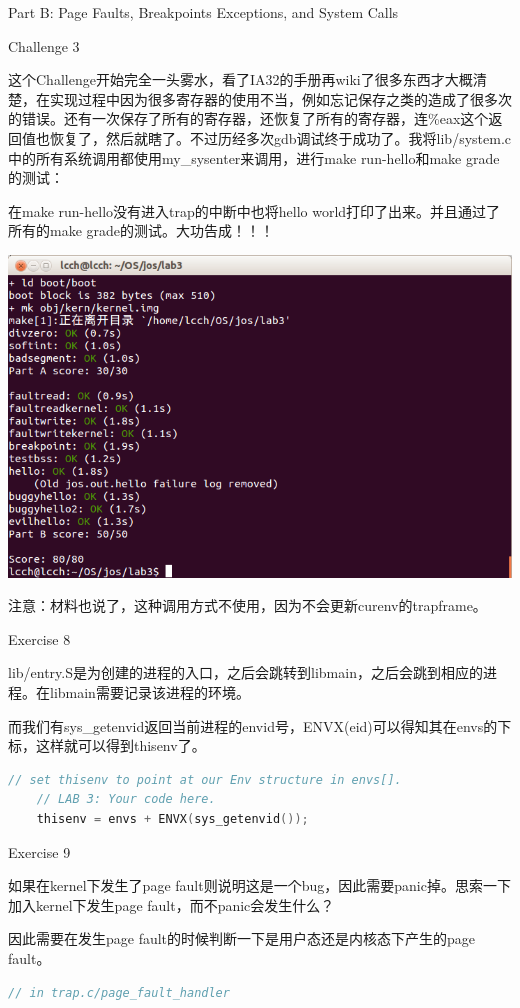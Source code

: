 \documentclass[GBK,winfonts,a4paper,10pt]{ctexart}
\begin{document}
\begin{section}{ Part B: Page Faults, Breakpoints Exceptions, and System Calls }
\begin{subsection}{ Challenge 3 }
\par
这个Challenge开始完全一头雾水，看了IA32的手册再wiki了很多东西才大概清楚，在实现过程中因为很多寄存器的使用不当，例如忘记保存之类的造成了很多次的错误。还有一次保存了所有的寄存器，还恢复了所有的寄存器，连\%eax这个返回值也恢复了，然后就瞎了。不过历经多次gdb调试终于成功了。我将lib/system.c中的所有系统调用都使用my\_sysenter来调用，进行make run-hello和make grade的测试：\par
\par
在make run-hello没有进入trap的中断中也将hello world打印了出来。并且通过了所有的make grade的测试。大功告成！！！\par
\includegraphics[scale=0.5]{ch3.png}
\par
注意：材料也说了，这种调用方式不使用，因为不会更新curenv的trapframe。
\end{subsection}

\begin{subsection}{ Exercise 8 }
\par
lib/entry.S是为创建的进程的入口，之后会跳转到libmain，之后会跳到相应的进程。在libmain需要记录该进程的环境。
\par
而我们有sys\_getenvid返回当前进程的envid号，ENVX(eid)可以得知其在envs的下标，这样就可以得到thisenv了。
\begin{lstlisting}[language=C]
	// set thisenv to point at our Env structure in envs[].
	// LAB 3: Your code here.
	thisenv = envs + ENVX(sys_getenvid());
\end{lstlisting}

\end{subsection}

\begin{subsection}{ Exercise 9 }
\par
如果在kernel下发生了page fault则说明这是一个bug，因此需要panic掉。思索一下加入kernel下发生page fault，而不panic会发生什么？
\par
因此需要在发生page fault的时候判断一下是用户态还是内核态下产生的page fault。
\par
\begin{lstlisting}[language=C]
// in trap.c/page_fault_handler


\end{lstlisting}
\end{subsection}
\end{section}
\end{document}
